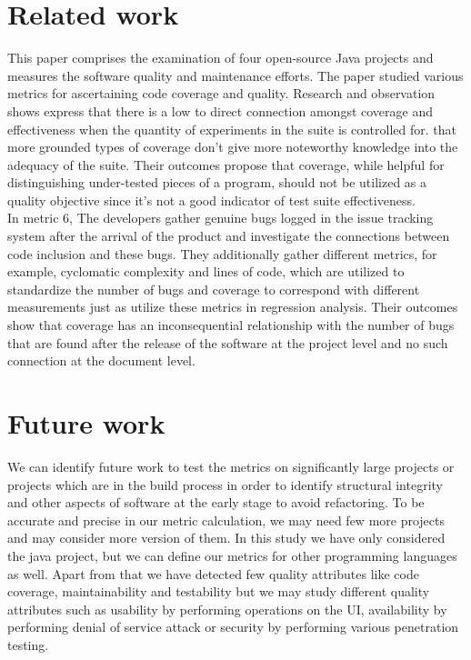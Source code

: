 \documentclass[letterpaper, 12 pt, conference]{ieeetran}  %
\begin{document}
\section{Related work}
This paper comprises the examination of four open-source Java projects and measures
the software quality and maintenance efforts. The paper studied various metrics for ascertaining code coverage and quality. Research and observation shows express that
there is a low to direct connection amongst coverage and effectiveness when the quantity of
experiments in the suite is controlled for. that more grounded types of coverage don't give more noteworthy knowledge into the adequacy of the suite. Their outcomes propose that
coverage, while helpful for distinguishing under-tested pieces of a program, should not be
utilized as a quality objective since it's not a good indicator of test suite effectiveness.
\\ In metric 6, The developers gather genuine
bugs logged in the issue tracking system after the arrival of the product and investigate the
connections between code inclusion and these bugs.
They additionally gather different metrics, for example, cyclomatic complexity and lines of code,
which are utilized to standardize the number of bugs and coverage to correspond with different
measurements just as utilize these metrics in regression analysis. Their outcomes show that
coverage has an inconsequential relationship with the number of bugs that are found after the
release of the software at the project level and no such connection at the document level.
\medskip

\section{Future work}
We can identify future work to test the metrics on significantly large projects or projects which are in the build process in order to identify structural integrity and other aspects of software at the early stage to avoid refactoring. To be accurate and precise in our metric calculation, we may need few more projects and may consider more version of them. In this study we have only considered the java project, but we can define our metrics for other programming languages as well. Apart from that we have detected few quality attributes like code coverage, maintainability and testability but we may study different quality attributes such as usability by performing operations on the UI, availability by performing denial of service attack or security by performing various penetration testing.
\medskip
\end{document}
